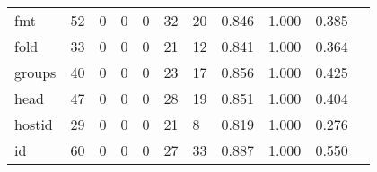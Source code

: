 \begin{longtable}{lp{1.2cm}p{1.2cm}p{1.2cm}p{1.2cm}p{1.2cm}p{1.2cm}p{1.2cm}p{1.2cm}p{1.2cm}p{1.2cm}}
fmt       &                                    52 &                                                  0 &                                                  0 &                                                  0 &                                                 32 &                                                 20 &                                         0.846 &                                              1.000 &                                              0.385 \\
fold      &                                    33 &                                                  0 &                                                  0 &                                                  0 &                                                 21 &                                                 12 &                                         0.841 &                                              1.000 &                                              0.364 \\
groups    &                                    40 &                                                  0 &                                                  0 &                                                  0 &                                                 23 &                                                 17 &                                         0.856 &                                              1.000 &                                              0.425 \\
head      &                                    47 &                                                  0 &                                                  0 &                                                  0 &                                                 28 &                                                 19 &                                         0.851 &                                              1.000 &                                              0.404 \\
hostid    &                                    29 &                                                  0 &                                                  0 &                                                  0 &                                                 21 &                                                  8 &                                         0.819 &                                              1.000 &                                              0.276 \\
id        &                                    60 &                                                  0 &                                                  0 &                                                  0 &                                                 27 &                                                 33 &                                         0.887 &                                              1.000 &                                              0.550 \\

\end{longtable}
